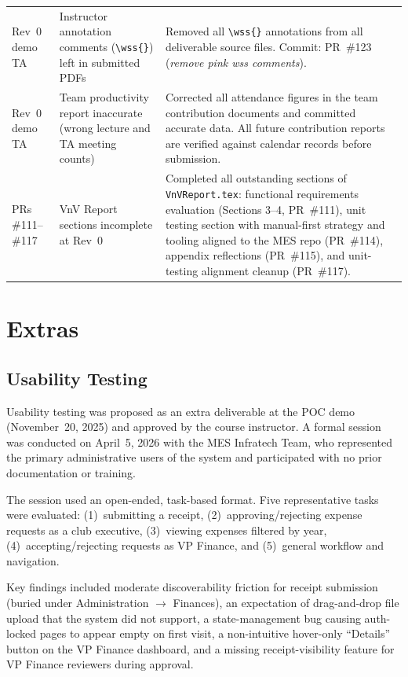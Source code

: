 \documentclass{article}
\begin{document}
\begin{longtable}{p{3.2cm} p{3.8cm} p{7.4cm}}
Rev~0 demo TA
  & Instructor annotation comments (\texttt{\textbackslash wss\{\}})
    left in submitted PDFs
  & Removed all \texttt{\textbackslash wss\{\}} annotations from all
    deliverable source files.
    Commit: PR~\#123 (\textit{remove pink wss comments}).
\\[4pt]

Rev~0 demo TA
  & Team productivity report inaccurate
    (wrong lecture and TA meeting counts)
  & Corrected all attendance figures in the team contribution documents
    and committed accurate data.  All future contribution reports are
    verified against calendar records before submission.
\\[4pt]

PRs \#111--\#117
  & VnV Report sections incomplete at Rev~0
  & Completed all outstanding sections of \texttt{VnVReport.tex}:
    functional requirements evaluation (Sections 3--4, PR~\#111),
    unit testing section with manual-first strategy and tooling
    aligned to the MES repo (PR~\#114), appendix reflections
    (PR~\#115), and unit-testing alignment cleanup (PR~\#117).
\\

\bottomrule
\end{longtable}

\section{Extras}

\subsection{Usability Testing}

Usability testing was proposed as an extra deliverable at the POC demo
(November~20, 2025) and approved by the course instructor.  A formal
session was conducted on April~5, 2026 with the MES Infratech Team, who
represented the primary administrative users of the system and participated
with no prior documentation or training.

The session used an open-ended, task-based format.  Five representative tasks were evaluated: (1)~submitting a
receipt, (2)~approving/rejecting expense requests as a club executive,
(3)~viewing expenses filtered by year, (4)~accepting/rejecting requests as
VP Finance, and (5)~general workflow and navigation.

Key findings included moderate discoverability friction for receipt
submission (buried under Administration $\rightarrow$ Finances), an
expectation of drag-and-drop file upload that the system did not support, a
state-management bug causing auth-locked pages to appear empty on first
visit, a non-intuitive hover-only ``Details'' button on the VP Finance
dashboard, and a missing receipt-visibility feature for VP Finance
reviewers during approval.
\end{document}
